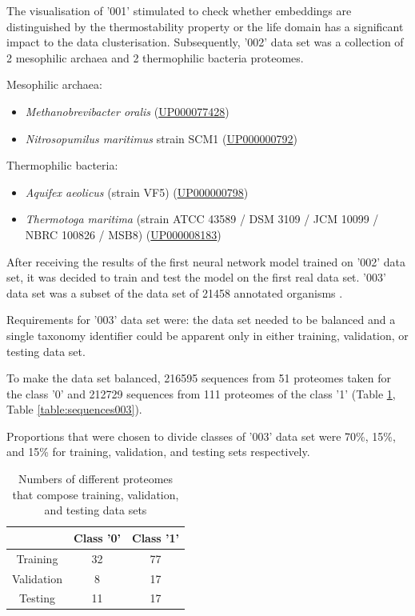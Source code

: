 \documentclass[12pt]{article}
\begin{document}
	The visualisation of '001' stimulated to check whether embeddings are 
	distinguished by the thermostability property or the life domain has a
	significant impact to the data clusterisation. Subsequently, '002' data set 
	was a collection of 2 mesophilic archaea and 2 thermophilic bacteria
	proteomes.

	\vspace*{0.5cm}

	Mesophilic archaea:

	\begin{itemize}
		\item \textit{Methanobrevibacter oralis} 
		(\href{https://www.uniprot.org/proteomes/UP000077428}{UP000077428})
		\item \textit{Nitrosopumilus maritimus} strain SCM1 (\href{https://www.uniprot.org/proteomes/UP000000792}{UP000000792})
	\end{itemize}

	Thermophilic bacteria:

	\begin{itemize}
		\item \textit{Aquifex aeolicus} (strain VF5)
		(\href{https://www.uniprot.org/proteomes/UP000000798}{UP000000798})
		\item \textit{Thermotoga maritima} 
		(strain ATCC 43589 / DSM 3109 / JCM 10099 / NBRC 100826 / MSB8) 
		(\href{https://www.uniprot.org/proteomes/UP000008183}{UP000008183})
	\end{itemize}

	After receiving the results of the first neural network model trained on 
	'002' data set, it was decided to train and test the model on the first 
	real data set. '003' data set was a subset of the data set of 21458 
	annotated organisms \cite{engqvist_martin_karl_magnus_2018_1175609}. 
	
	Requirements for '003' data set were: the data set needed to be balanced and a
	single taxonomy identifier could be apparent only in either training, validation,
	or testing data set. 
	
	To make the data set balanced, 216595 sequences from 51 proteomes taken 
	for the class '0' and 212729 sequences from 111 proteomes of the class '1' 
	(Table \ref{table:proteomes003}, Table \ref{table:sequences003}).

	Proportions that were chosen to divide classes of '003'
	data set were 70\%, 15\%, and 15\% for training, validation, and testing
	sets respectively.

	\begin{table}[h!]
		\caption{Numbers of different proteomes that compose training, 
		validation, and testing data sets}
		\vspace{0.2cm}
		\centering
		\begin{tabular}{ | c c c | }
			\hline
			& Class '0' & Class '1' \\
			\hline
			Training & 32 & 77 \\ 
			Validation & 8 & 17 \\
			Testing & 11 & 17 \\
			\hline   
		\end{tabular}
		\label{table:proteomes003}
	\end{table}
\end{document}
